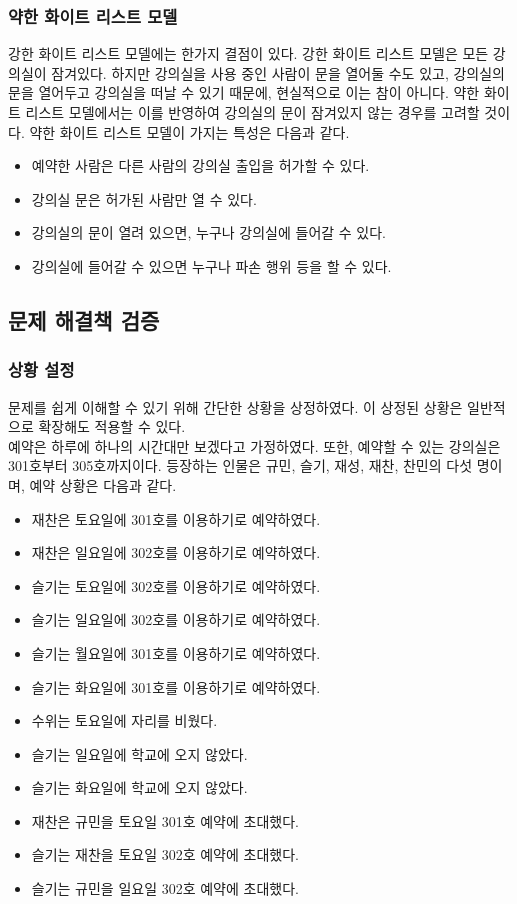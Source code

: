 \documentclass[11pt,a4paper]{article}
\begin{document}
\subsubsection{약한 화이트 리스트 모델}
강한 화이트 리스트 모델에는 한가지 결점이 있다. 강한 화이트 리스트 모델은 모든 강의실이 잠겨있다. 하지만 강의실을 사용 중인 사람이 문을 열어둘 수도 있고, 강의실의 문을 열어두고 강의실을 떠날 수 있기 때문에, 현실적으로 이는 참이 아니다. 약한 화이트 리스트 모델에서는 이를 반영하여 강의실의 문이 잠겨있지 않는 경우를 고려할 것이다. 약한 화이트 리스트 모델이 가지는 특성은 다음과 같다.
\begin{itemize}
\item 예약한 사람은 다른 사람의 강의실 출입을 허가할 수 있다.
\item 강의실 문은 허가된 사람만 열 수 있다.
\item 강의실의 문이 열려 있으면, 누구나 강의실에 들어갈 수 있다.
\item 강의실에 들어갈 수 있으면 누구나 파손 행위 등을 할 수 있다.
\end{itemize}

\subsection{문제 해결책 검증}

\subsubsection{상황 설정}
문제를 쉽게 이해할 수 있기 위해 간단한 상황을 상정하였다. 이 상정된 상황은 일반적으로 확장해도 적용할 수 있다.\\
예약은 하루에 하나의 시간대만 보겠다고 가정하였다. 또한, 예약할 수 있는 강의실은 301호부터 305호까지이다. 등장하는 인물은 규민, 슬기, 재성, 재찬, 찬민의 다섯 명이며, 예약 상황은 다음과 같다.
\begin{itemize} 
\item 재찬은 토요일에 301호를 이용하기로 예약하였다.
\item 재찬은 일요일에 302호를 이용하기로 예약하였다.
\item 슬기는 토요일에 302호를 이용하기로 예약하였다.
\item 슬기는 일요일에 302호를 이용하기로 예약하였다.
\item 슬기는 월요일에 301호를 이용하기로 예약하였다.
\item 슬기는 화요일에 301호를 이용하기로 예약하였다.
\item 수위는 토요일에 자리를 비웠다.
\item 슬기는 일요일에 학교에 오지 않았다.
\item 슬기는 화요일에 학교에 오지 않았다.
\item 재찬은 규민을 토요일 301호 예약에 초대했다.
\item 슬기는 재찬을 토요일 302호 예약에 초대했다.
\item 슬기는 규민을 일요일 302호 예약에 초대했다.
\end{itemize}
\end{document}
